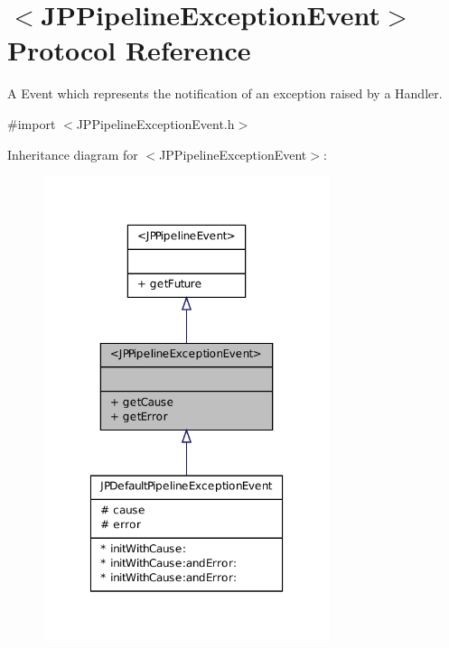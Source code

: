 \hypertarget{a00027}{
\section{$<$JPPipelineExceptionEvent$>$ Protocol Reference}
\label{a00027}
}


A Event which represents the notification of an exception raised by a Handler.  




{\ttfamily \#import $<$JPPipelineExceptionEvent.h$>$}



Inheritance diagram for $<$JPPipelineExceptionEvent$>$:\nopagebreak
\begin{figure}[H]
\begin{center}
\leavevmode
\includegraphics[width=238pt]{a00136}
\end{center}
\end{figure}


